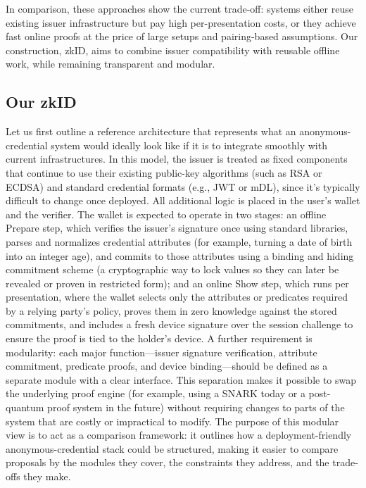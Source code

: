 In comparison, these approaches show the current trade-off: systems either reuse existing issuer infrastructure but pay high per-presentation costs, or they achieve fast online proofs at the price of large setups and pairing-based assumptions. Our construction, zkID, aims to combine issuer compatibility with reusable offline work, while remaining transparent and modular.

\subsection{Our zkID}
Let us first outline a reference architecture that represents what an anonymous-credential system would ideally look like if it is to integrate smoothly with current infrastructures. In this model, the issuer is treated as fixed components that continue to use their existing public-key algorithms (such as RSA or ECDSA) and standard credential formats (e.g., JWT or mDL), since it's typically difficult to change once deployed. All additional logic is placed in the user’s wallet and the verifier.
The wallet is expected to operate in two stages: an offline Prepare step, which verifies the issuer’s signature once using standard libraries, parses and normalizes credential attributes (for example, turning a date of birth into an integer age), and commits to those attributes using a binding and hiding commitment scheme (a cryptographic way to lock values so they can later be revealed or proven in restricted form); and an online Show step, which runs per presentation, where the wallet selects only the attributes or predicates required by a relying party’s policy, proves them in zero knowledge against the stored commitments, and includes a fresh device signature over the session challenge to ensure the proof is tied to the holder’s device.
A further requirement is modularity: each major function---issuer signature verification, attribute commitment, predicate proofs, and device binding---should be defined as a separate module with a clear interface. This separation makes it possible to swap the underlying proof engine (for example, using a SNARK today or a post-quantum proof system in the future) without requiring changes to parts of the system that are costly or impractical to modify. The purpose of this modular view is to act as a comparison framework: it outlines how a deployment-friendly anonymous-credential stack could be structured, making it easier to compare proposals by the modules they cover, the constraints they address, and the trade-offs they make.

